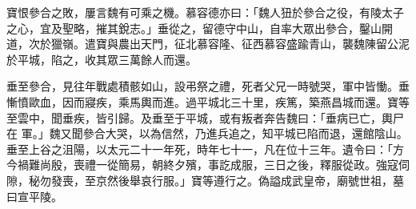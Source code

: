 \begin{pinyinscope}
 寶恨參合之敗，屢言魏有可乘之機。慕容德亦曰：「魏人狃於參合之役，有陵太子之心，宜及聖略，摧其銳志。」垂從之，留德守中山，自率大眾出參合，鑿山開道，次於獵嶺。遣寶與農出天門，征北慕容隆、征西慕容盛踰青山，襲魏陳留公泥於平城，陷之，收其眾三萬餘人而還。



 垂至參合，見往年戰處積骸如山，設弔祭之禮，死者父兄一時號哭，軍中皆慟。垂慚憤歐血，因而寢疾，乘馬輿而進。過平城北三十里，疾篤，築燕昌城而還。寶等至雲中，聞垂疾，皆引歸。及垂至于平城，或有叛者奔告魏曰：「垂病已亡，輿尸在
 軍。」魏又聞參合大哭，以為信然，乃進兵追之，知平城已陷而退，還館陰山。垂至上谷之沮陽，以太元二十一年死，時年七十一，凡在位十三年。遺令曰：「方今禍難尚殷，喪禮一從簡易，朝終夕殯，事訖成服，三日之後，釋服從政。強寇伺隙，秘勿發喪，至京然後舉哀行服。」寶等遵行之。偽謚成武皇帝，廟號世祖，墓曰宣平陵。



\end{pinyinscope}